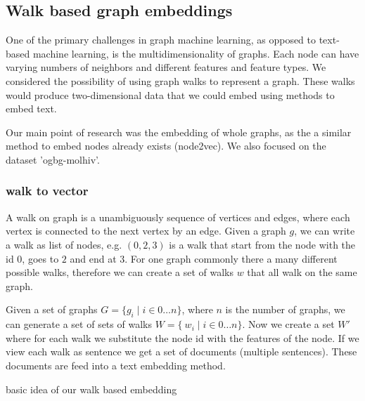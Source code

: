 \subsection{Walk based graph embeddings}

One of the  primary challenges in graph machine learning, as opposed to text-based machine learning, is the multidimensionality of graphs. Each node can have varying numbers of neighbors and different features and feature types. We considered the possibility of using graph walks to represent a graph. These walks would produce two-dimensional data that we could embed using methods to embed text.

Our main point of research was the embedding of whole graphs, as the a similar method to embed nodes already exists (node2vec). We also focused on the dataset 'ogbg-molhiv'.

\subsubsection{walk to vector}
A walk on graph is a unambiguously sequence of vertices and edges, where each vertex is connected to the next vertex by an edge. Given a graph $g$, we can write a walk as list of nodes, e.g. $(0, 2, 3)$ is a walk that start from the node with the id $0$, goes to $2$ and end at $3$. For one graph commonly there a many different possible walks, therefore we can create a set of walks $w$ that all walk on the same graph.

Given a set of graphs $G = \{g_i \mid i \in 0 \dots n \}$, where $n$ is the number of graphs, we can generate a set of sets of walks $W = \{\ w_i \mid i \in 0 \dots n  \}$. Now we create a set $W'$ where for each walk we substitute the node id with the features of the node. If we view each walk as sentence we get a set of documents (multiple sentences). These documents are feed into a text embedding method.


\begin{minipage}{\linewidth}
    \begin{algorithm}[H]
        \DontPrintSemicolon


        \caption{basic idea of our walk based embedding}

    \end{algorithm}
\end{minipage}

